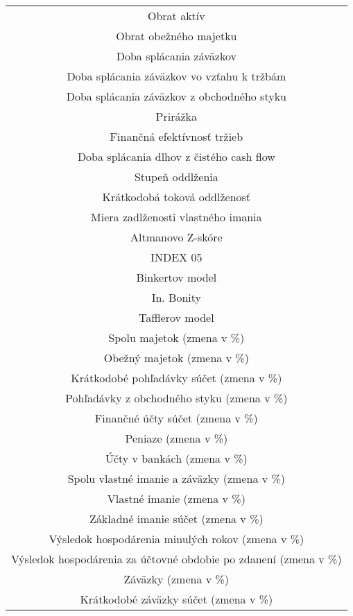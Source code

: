 \begin{longtable}{ |c| }
        Obrat aktív \\
        Obrat obežného majetku \\
        \hline
        Doba splácania záväzkov \\
        Doba splácania záväzkov vo vzťahu k tržbám \\
        Doba splácania záväzkov z obchodného styku \\
        \hline
        Prirážka \\
        \hline
        Finančná efektívnosť tržieb \\
        \hline
        Doba splácania dlhov z čistého cash flow \\
        Stupeň oddlženia \\
        Krátkodobá toková oddlženosť \\
        Miera zadlženosti vlastného imania \\
        \hline
        Altmanovo Z-skóre \\
        \hline
        INDEX 05 \\
        \hline
        Binkertov model \\
        \hline
        In. Bonity \\
        \hline
        Tafflerov model \\
        \hline
        Spolu majetok (zmena v \%) \\
        \hline
        Obežný majetok (zmena v \%) \\
        \hline
        Krátkodobé pohľadávky súčet (zmena v \%) \\
        \hline
        Pohľadávky z obchodného styku (zmena v \%) \\
        \hline
        Finančné účty súčet (zmena v \%) \\
        Peniaze (zmena v \%) \\
        Účty v bankách (zmena v \%) \\
        \hline
        Spolu vlastné imanie a záväzky (zmena v \%) \\
        \hline
        Vlastné imanie (zmena v \%) \\
        Základné imanie súčet (zmena v \%) \\
        Výsledok hospodárenia minulých rokov (zmena v \%) \\
        Výsledok hospodárenia za účtovné obdobie po zdanení (zmena v \%) \\
        \hline
        Záväzky (zmena v \%) \\
        \hline
        Krátkodobé záväzky súčet (zmena v \%) \\

\end{longtable}
